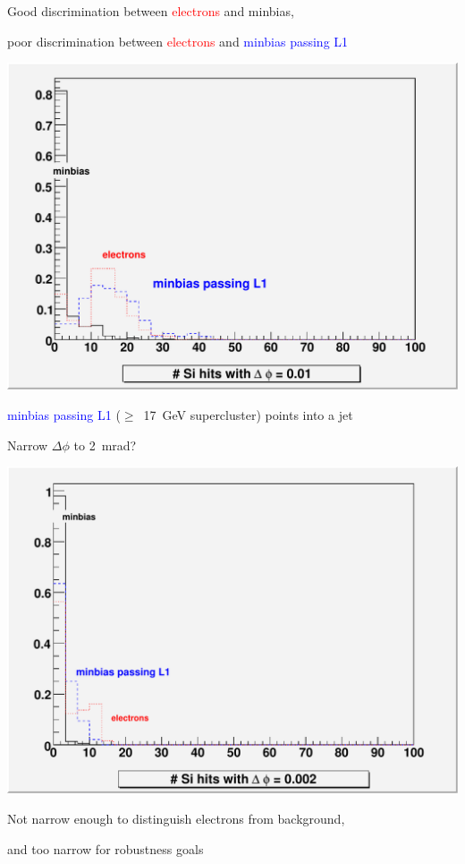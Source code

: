 \documentclass[12pt,compress]{beamer}
\begin{document}
\begin{frame}
Good discrimination between \textcolor{red}{electrons} and minbias,

poor discrimination between \textcolor{red}{electrons} and \textcolor{blue}{minbias passing L1}

\begin{center}
\includegraphics[width=0.65\linewidth]{hitdistributions}
\end{center}

\textcolor{blue}{minbias passing L1} ($\ge$~17~GeV supercluster) points into a jet
\end{frame}

\begin{frame}
Narrow $\Delta \phi$ to 2~mrad?

\begin{center}
\includegraphics[width=0.65\linewidth]{hitdistributions_narrow}
\end{center}

Not narrow enough to distinguish electrons from background,

and too narrow for robustness goals
\end{frame}
\end{document}
